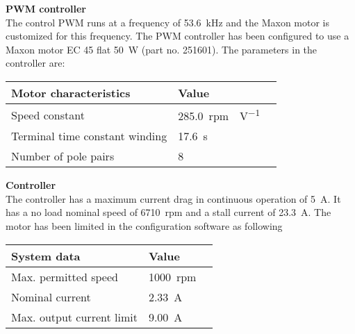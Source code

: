 \textbf{PWM controller}\\
The control PWM runs at a frequency of \SI{53,6}{kHz} and the Maxon motor is customized for this frequency.
The PWM controller has been configured to use a Maxon motor EC 45 flat \SI{50}{W} (part no. 251601). The parameters in the controller are:
\begin{table}[H]
	\begin{tabular}{|l|l|p{4.3cm}|}
		\hline%
		\textbf{Motor characteristics}       &  \textbf{Value}         \\
		\hline%
		Speed constant                                & \SI{285,0}{rpm\cdot V^{-1}}           \\
		\hline%
		Terminal time constant winding							  & \SI{17,6}{s}              \\
		\hline%
		Number of pole pairs							  & 8              \\
		\hline%
	\end{tabular}
\end{table}

\textbf{Controller}\\
The controller has a maximum current drag in continuous operation of \SI{5}{A}. It has a no load nominal speed of \SI{6710}{rpm} and a stall current of \SI{23,3}{A}. The motor has been limited in the configuration software as following
\begin{table}[H]
	\begin{tabular}{|l|l|p{4.3cm}|}
		\hline%
		\textbf{System data}       &  \textbf{Value}         \\
		\hline%
		Max. permitted speed                                & \SI{1000}{rpm}           \\
		\hline%
		Nominal current							  & \SI{2,33}{A}              \\
		\hline%
		Max. output current limit							  & \SI{9,00}{A}              \\
		\hline%
	\end{tabular}
\end{table}

